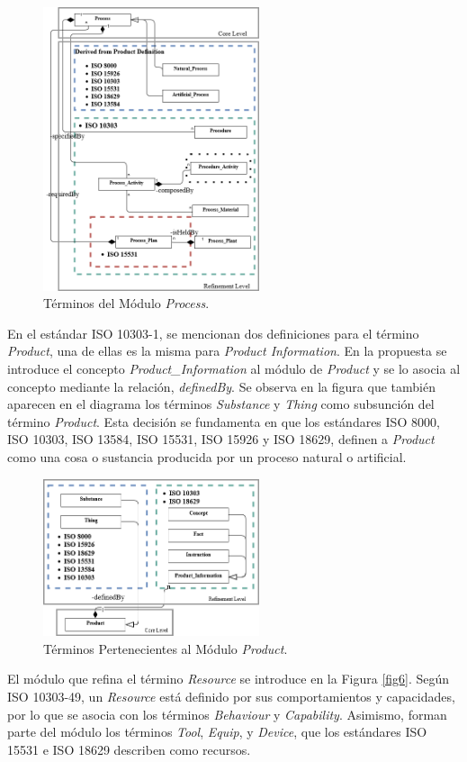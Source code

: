 \documentclass[journal]{IEEEtran}
\begin{document}
\begin{figure}[!t]
\centering
\includegraphics[width=2.5in]{figures/Completo-Process.png}
\caption{T\'erminos del M\'odulo \emph{Process}.}
\label{fig4}
\end{figure}

En el est\'andar ISO 10303-1, se mencionan dos definiciones para el t\'ermino \emph{Product}, una de ellas es la misma para \emph{Product Information}. En la propuesta se introduce el concepto \emph{Product\_Information} al m\'odulo de \emph{Product} y se lo asocia al concepto mediante la relaci\'on, \emph{definedBy}. Se observa en la figura que tambi\'en aparecen en el diagrama los t\'erminos \emph{Substance} y \emph{Thing} como subsunci\'on del t\'ermino \emph{Product}. Esta decisi\'on se fundamenta en que los est\'andares ISO 8000, ISO 10303, ISO 13584, ISO 15531, ISO 15926 y ISO 18629, definen a \emph{Product} como una cosa o sustancia producida por un proceso natural o artificial.

\begin{figure}[!t]
\centering
\includegraphics[width=2.5in]{figures/Completo-Product.png}
\caption{T\'erminos Pertenecientes al M\'odulo \emph{Product}.}
\label{fig5}
\end{figure}

El m\'odulo que refina el t\'ermino \emph{Resource} se introduce en la Figura \ref{fig6}. Seg\'un ISO 10303-49, un \emph{Resource} est\'a definido por sus comportamientos y capacidades, por lo que se asocia con los t\'erminos \emph{Behaviour} y \emph{Capability}. Asimismo, forman parte del m\'odulo los t\'erminos \emph{Tool}, \emph{Equip}, y \emph{Device}, que los est\'andares ISO 15531 e ISO 18629 describen como recursos. 
\end{document}

